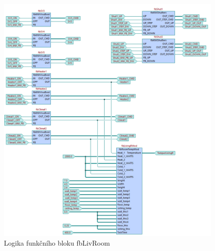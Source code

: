\begin{figure}[!ht]
  \begin{center}
  \includegraphics[scale=0.6]{obrazky/fbLivRoom.png}
  \end{center}
  \caption[Logika funkčního bloku fbLivRoom]{Logika funkčního bloku fbLivRoom}
  \label{fig:fbLivRoom}
\end{figure}
\pagebreak
